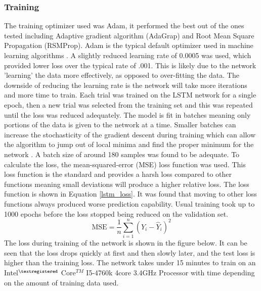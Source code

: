 \subsubsection{Training}
The training optimizer used was Adam, it performed the best out of the ones tested including Adaptive gradient algorithm (AdaGrap) and Root Mean Square Propagation (RSMProp). Adam is the typical default optimizer used in machine learning algorithms \cite{learn_keras}. A slightly reduced learning rate of 0.0005 was used, which provided lower loss over the typical rate of .001. This is likely due to the network 'learning' the data more effectively, as opposed to over-fitting the data. The downside of reducing the learning rate is the network will take more iterations and more time to train. Each trial was trained on the LSTM network for a single epoch, then a new trial was selected from the training set and this was repeated until the loss was reduced adequately. The model is fit in batches meaning only portions of the data is given to the network at a time. Smaller batches can increase the stochasticity of the gradient descent during training  which can allow the algorithm to jump out of local minima and find the proper minimum for the network \cite{learn_keras}. A batch size of around 180 samples was found to be adequate. To calculate the loss, the mean-squared-error (MSE) loss function was used. This loss function is the standard and provides a harsh loss compared to other functions meaning small deviations will produce a higher relative loss. The loss function is shown in Equation \ref{lstm_loss}. It was found that moving to other loss functions always produced worse prediction capability. Usual training took up to 1000 epochs before the loss stopped being reduced on the validation set.
\begin{equation}\label{lstm_loss}
    \text{MSE} = \frac{1}{n}\sum^n_{i=1}(Y_i - \hat{Y}_i)^2
\end{equation}
 The loss during training of the network is shown in the figure below. It can be seen that the loss drops quickly at first and then slowly later, and the test loss is higher than the training loss. The network takes under 15 minutes to train on an Intel$^{\textregistered}$ Core$^{TM}$ I5-4760k 4core 3.4GHz Processor with time depending on the amount of training data used. 
